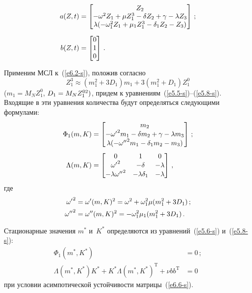 \begin{multicols}{2}
\vspace*{-6pt}

\noindent
\begin{align*}
a(Z,t) &=\begin{bmatrix}
    Z_2\\
    -\omega^2 Z_1 +\mu Z_1^3 -\delta Z_2 +\gamma-\lambda Z_3\\
    \lambda(-\omega_1^2 Z_1 +\mu_1 Z_1^3 -\delta_1 Z_2 - Z_3)\end{bmatrix}\,;\\[6pt]
    b(Z,t) &=\begin{bmatrix}
    0\\
    1\\
    0\end{bmatrix}\,.
    \end{align*}

Применим МСЛ к~(\ref{e6.2-s}), положив согласно~\cite{8-s}
    \begin{equation*}
    Z_1^3 \approx (m_1^2 + 3D_1) m_1 + 3 (m_1^2 + D_1) 
    Z_1^0 
    \end{equation*}
($m_1 = M_N Z_1^0$, $D_1 \hm= M_N Z_1^{02})$,
придем к уравнениям~(\ref{e5.5-s})--(\ref{e5.8-s}). Входящие в эти уравнения
количества будут определяться сле\-ду\-ющи\-ми формулами:
\begin{align}
\Phi_1 (m,K) &=\begin{bmatrix}
    m_2\\
    -{\omega'}^2 m_1 -\delta m_2 +\gamma -\lambda m_3\\
    \lambda(-{\omega''}^2 m_1 -\delta_1 m_2 - m_3)\end{bmatrix}\,;\notag\\[3pt]
   \Lambda (m,K) &=\begin{bmatrix}
    0&1&0\cr
    {\omega'}^2 &-\delta &-\lambda\\
    -\lambda {\omega''}^2 &-\lambda \delta_1&-\lambda
    \end{bmatrix}\,,\label{e6.6-s}
    \end{align}
где
\begin{align*}
{\omega'}^2 &=\omega'(m,K)^2 = \omega^2 +\omega_1^2 \mu (m_1^2+3D_1)\,;\\
{\omega''}^2 &= \omega'' (m,K)^2 =-\omega_1^2 \mu_1 (m_1^2 + 3 D_1)\,.
\end{align*}

Стационарные значения  $m^*$ и~$K^*$ определяются из уравнений~(\ref{e5.6-s}) и~(\ref{e5.8-s}):
    \begin{align*}
\Phi_1 (m^*, K^*) &=0\,;\\
\Lambda (m^*, K^*) K^* + K^* \Lambda (m^*, K^*)^{\mathrm{T}} + \nu b b^{\mathrm{T}} &=0
\end{align*}
при условии асимпотической устойчивости матрицы~(\ref{e6.6-s}).


\end{multicols}
